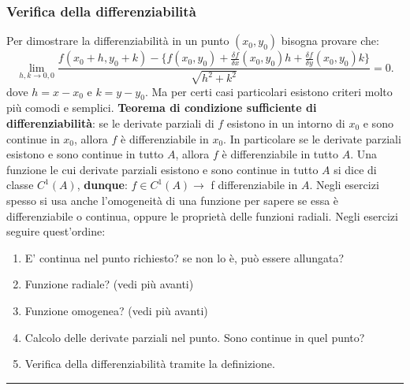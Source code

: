 \subsubsection{Verifica della differenziabilità}
Per dimostrare la differenziabilità in un punto $(x_0,y_0)$ bisogna provare che:
\[
    \lim_{h,k\rightarrow 0,0}\frac{f(x_0+h, y_0+k)-\{
        f(x_0,y_0)+ \frac{\delta f}{\delta x}(x_0,y_0) h + \frac{\delta f}{\delta y}(x_0,y_0)k
        \}}{\sqrt{h^2+k^2}} =0.
\]
dove $h = x-x_0$ e $k = y-y_0$.\newline
\newline
Ma per certi casi particolari esistono criteri molto più comodi e semplici.\newline
\newline
\textbf{Teorema di condizione sufficiente di differenziabilità}: se le derivate parziali di $f$ esistono in un intorno di $x_0$ e sono continue in $x_0$, allora $f$ è differenziabile in $x_0$.\newline
In particolare se le derivate parziali esistono e sono continue in tutto $A$, allora $f$ è differenziabile in tutto $A$.\newline
Una funzione le cui derivate parziali esistono e sono continue in tutto $A$ si dice di classe $C^1(A)$, \textbf{dunque}: $f \in C^1(A) \rightarrow$ f differenziabile in $A$.\newline
\newline
Negli esercizi spesso si usa anche l'omogeneità di una funzione per sapere se essa è differenziabile o continua, oppure le proprietà delle funzioni radiali.\newline
\newline
Negli esercizi seguire quest'ordine:
\begin{enumerate}
    \item E' continua nel punto richiesto? se non lo è, può essere allungata?
    \item Funzione radiale? (vedi più avanti)
    \item Funzione omogenea? (vedi più avanti)
    \item Calcolo delle derivate parziali nel punto. Sono continue in quel punto?
    \item Verifica della differenziabilità tramite la definizione.
\end{enumerate}
\rule{\textwidth}{0.4pt}
